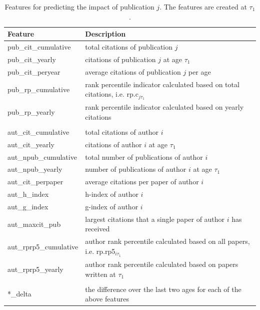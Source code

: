 \begin{refsection}
\begin{table}[htbp]
  \centering
    \begin{tabular}{l|l}
    Feature & Description \\
    \midrule
    pub\_cit\_cumulative & total citations of publication $j$ \\
    pub\_cit\_yearly & citations of publication $j$ at age $\tau_1$ \\
    pub\_cit\_peryear & average citations of publication $j$ per age \\
    pub\_rp\_cumulative & rank percentile indicator calculated based on total citations, i.e. rp.c$_{j\tau_1}$ \\
    pub\_rp\_yearly & rank percentile indicator calculated based on yearly citations \\
          &  \\
    aut\_cit\_cumulative          & total citations of author $i$ \\
    aut\_cit\_yearly          & citations of author $i$ at age $\tau_1$ \\
    aut\_npub\_cumulative & total number of publications of author $i$ \\
    aut\_npub\_yearly & number of publications of author $i$ at age $\tau_1$ \\
    aut\_cit\_perpaper & average citations per paper of author $i$  \\
    aut\_h\_index & h-index of author $i$  \\
    aut\_g\_index & g-index of author $i$ \\
    aut\_maxcit\_pub & largest citations that a single paper of author $i$ has received \\
    aut\_rprp5\_cumulative & author rank percentile calculated based on all papers, i.e. rp.rp5$_{i\tau_1}$ \\
    aut\_rprp5\_yearly & author rank percentile calculated based on papers written at $\tau_1$ \\
          &  \\
    *\_delta & the difference over the last two ages for each of the above features \\
    \end{tabular}%
  \caption{Features for predicting the impact of publication $j$. The features are created at $\tau_1$.}
  \label{tab:features_pubrp}%
\end{table}%


\end{refsection}
